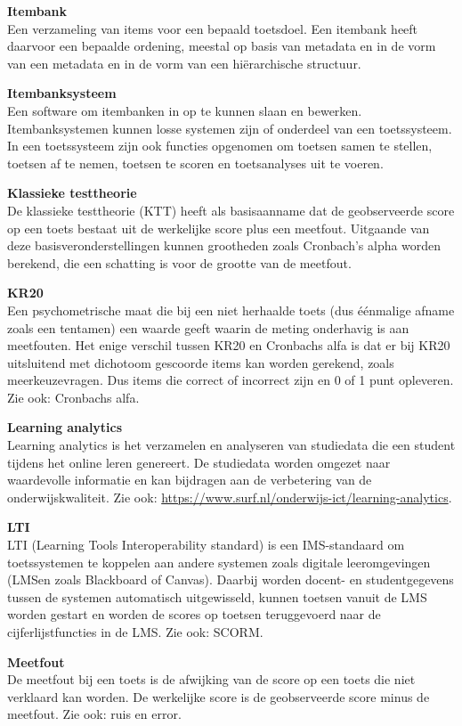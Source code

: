 \documentclass[
]{book}
\begin{document}
\textbf{Itembank}\\
Een verzameling van items voor een bepaald toetsdoel. Een itembank heeft daarvoor een bepaalde ordening, meestal op basis van metadata en in de vorm van een metadata en in de vorm van een hiërarchische structuur.

\textbf{Itembanksysteem}\\
Een software om itembanken in op te kunnen slaan en bewerken. Itembanksystemen kunnen losse systemen zijn of onderdeel van een toetssysteem. In een toetssysteem zijn ook functies opgenomen om toetsen samen te stellen, toetsen af te nemen, toetsen te scoren en toetsanalyses uit te voeren.

\textbf{Klassieke testtheorie}\\
De klassieke testtheorie (KTT) heeft als basisaanname dat de geobserveerde score op een toets bestaat uit de werkelijke score plus een meetfout. Uitgaande van deze basisveronderstellingen kunnen grootheden zoals Cronbach's alpha worden berekend, die een schatting is voor de grootte van de meetfout.

\textbf{KR20}\\
Een psychometrische maat die bij een niet herhaalde toets (dus éénmalige afname zoals een tentamen) een waarde geeft waarin de meting onderhavig is aan meetfouten. Het enige verschil tussen KR20 en Cronbachs alfa is dat er bij KR20 uitsluitend met dichotoom gescoorde items kan worden gerekend, zoals meerkeuzevragen. Dus items die correct of incorrect zijn en 0 of 1 punt opleveren. Zie ook: Cronbachs alfa.

\textbf{Learning analytics}\\
Learning analytics is het verzamelen en analyseren van studiedata die een student tijdens het online leren genereert. De studiedata worden omgezet naar waardevolle informatie en kan bijdragen aan de verbetering van de onderwijskwaliteit. Zie ook: \url{https://www.surf.nl/onderwijs-ict/learning-analytics}.

\textbf{LTI}\\
LTI (Learning Tools Interoperability standard) is een IMS-standaard om toetssystemen te koppelen aan andere systemen zoals digitale leeromgevingen (LMSen zoals Blackboard of Canvas). Daarbij worden docent- en studentgegevens tussen de systemen automatisch uitgewisseld, kunnen toetsen vanuit de LMS worden gestart en worden de scores op toetsen teruggevoerd naar de cijferlijstfuncties in de LMS. Zie ook: SCORM.

\textbf{Meetfout}\\
De meetfout bij een toets is de afwijking van de score op een toets die niet verklaard kan worden. De werkelijke score is de geobserveerde score minus de meetfout. Zie ook: ruis en error.
\end{document}
